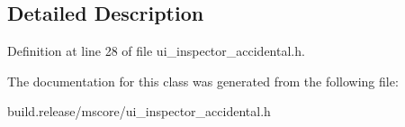\subsection{Detailed Description}


Definition at line 28 of file ui\+\_\+inspector\+\_\+accidental.\+h.



The documentation for this class was generated from the following file\+:\begin{DoxyCompactItemize}
\item 
build.\+release/mscore/ui\+\_\+inspector\+\_\+accidental.\+h\end{DoxyCompactItemize}
